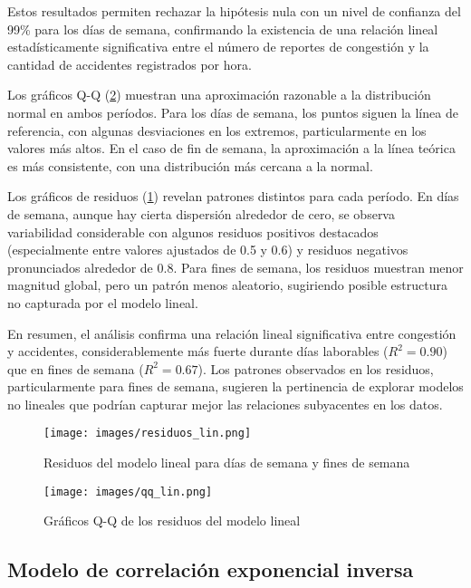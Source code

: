 \documentclass[12pt]{article}
\begin{document}
Estos resultados permiten rechazar la hipótesis nula con un nivel de confianza del 99\% para los días de semana, confirmando la existencia de una relación lineal estadísticamente significativa entre el número de reportes de congestión y la cantidad de accidentes registrados por hora.

Los gráficos Q-Q (\cref{fig:qq_lin}) muestran una aproximación razonable a la distribución normal en ambos períodos. Para los días de semana, los puntos siguen la línea de referencia, con algunas desviaciones en los extremos, particularmente en los valores más altos. En el caso de fin de semana, la aproximación a la línea teórica es más consistente, con una distribución más cercana a la normal.

Los gráficos de residuos (\cref{fig:resid_lin}) revelan patrones distintos para cada período. En días de semana, aunque hay cierta dispersión alrededor de cero, se observa variabilidad considerable con algunos residuos positivos destacados (especialmente entre valores ajustados de 0.5 y 0.6) y residuos negativos pronunciados alrededor de 0.8. Para fines de semana, los residuos muestran menor magnitud global, pero un patrón menos aleatorio, sugiriendo posible estructura no capturada por el modelo lineal.

En resumen, el análisis confirma una relación lineal significativa entre congestión y accidentes, considerablemente más fuerte durante días laborables ($R^2 = 0.90$) que en fines de semana ($R^2 = 0.67$). Los patrones observados en los residuos, particularmente para fines de semana, sugieren la pertinencia de explorar modelos no lineales que podrían capturar mejor las relaciones subyacentes en los datos.


\begin{figure}[H]
\centering
\texttt{[image: images/residuos\_lin.png]}
\caption{Residuos del modelo lineal para días de semana y fines de semana}
\label{fig:resid_lin}
\end{figure}

\begin{figure}[H]
\centering
\texttt{[image: images/qq\_lin.png]}
\caption{Gráficos Q-Q de los residuos del modelo lineal}
\label{fig:qq_lin}
\end{figure}


\subsection{Modelo de correlación exponencial inversa}
\end{document}
